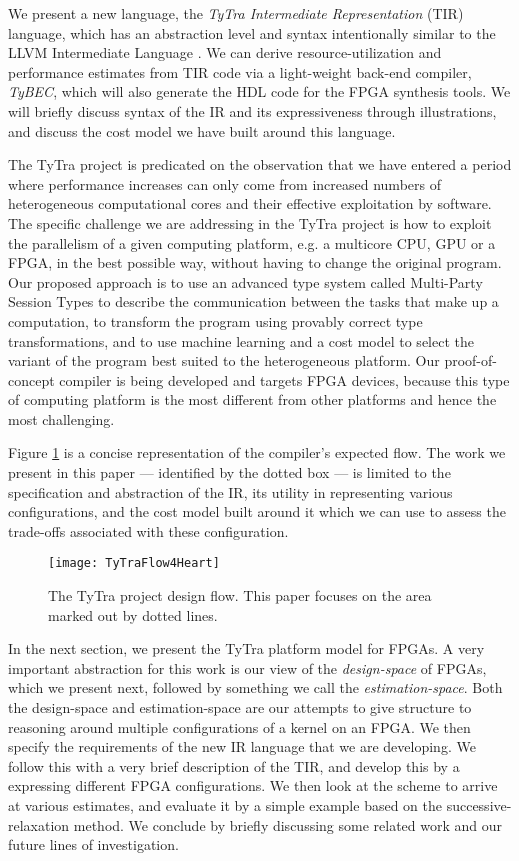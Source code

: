 \documentclass[]{heart2015_WN4Pre}
\begin{document}
We present a new language, the \textit{TyTra Intermediate Representation} (TIR) language, which has an abstraction level and syntax intentionally similar to the LLVM Intermediate Language \cite{123.303}. We can derive resource-utilization and performance estimates from TIR code via a light-weight back-end compiler, \textit{TyBEC}, which will also generate the HDL code for the FPGA synthesis tools. We will briefly discuss syntax of the IR and its expressiveness through illustrations, and discuss the cost model we have built around this language.

The TyTra project is predicated on the observation that we have entered a period where performance increases can only come from increased numbers of heterogeneous computational cores and their effective exploitation by software. The specific challenge we are addressing in the TyTra project is how to exploit the parallelism of a given computing platform, e.g. a multicore CPU, GPU or a FPGA, in the best possible way, without having to change the original program.
Our proposed approach is to use an advanced type system called Multi-Party Session Types \cite{123.203} to describe the communication between the tasks that make up a computation, to transform the program using provably correct type transformations, and to use machine learning and a cost model to select the variant of the program best suited to the heterogeneous platform.  Our proof-of-concept compiler is being developed and targets FPGA devices, because this type of computing platform is the most different from other platforms and hence the most challenging.

Figure \ref{fig:TyTra_Flow} is a concise representation of the compiler's expected flow. The work we present in this paper --- identified by the dotted box --- is limited to the specification and abstraction of the IR, its utility in representing various configurations, and the cost model built around it which we can use to assess the trade-offs associated with these configuration. 

\begin{figure}[th]
\centering
\texttt{[image: TyTraFlow4Heart]}
\caption{The TyTra project design flow. This paper focuses on the area marked out by dotted lines.}
\label{fig:TyTra_Flow}
\end{figure}

In the next section, we present the TyTra platform model for FPGAs. A very important abstraction for this work is our view of the \textit{design-space} of FPGAs, which we present next, followed by something we call the \textit{estimation-space}. Both the design-space and estimation-space are our attempts to give structure to reasoning around multiple configurations of a kernel on an FPGA. We then specify the requirements of the new IR language that we are developing. We follow this with a very brief description of the TIR, and develop this by a expressing different FPGA configurations. We then look at the scheme to arrive at various estimates, and evaluate it by a simple example based on the successive-relaxation method. We conclude by briefly discussing some related work and our future lines of investigation.
 
\end{document}
